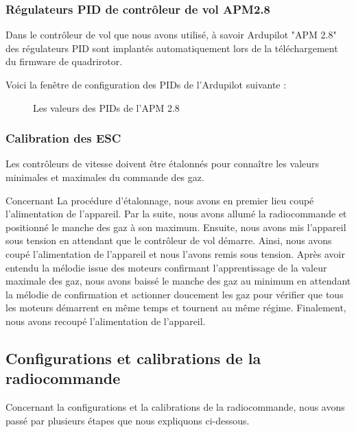 	\subsubsection{Régulateurs PID de contrôleur de vol APM2.8}
	Dans le contrôleur de vol que nous avons utilisé, à savoir Ardupilot "APM 2.8" des régulateurs PID sont implantés automatiquement lors de la téléchargement du firmware de quadrirotor.
	
	Voici la fenêtre de configuration des PIDs de l'Ardupilot suivante :
	\begin{figure} [H]
		\begin{center}
			\centering
		\end{center}
		\caption{Les valeurs des PIDs de l'APM 2.8}
	\end{figure}
	
	\subsubsection{Calibration des ESC}
	Les contrôleurs de vitesse doivent être étalonnés pour connaître les valeurs minimales et maximales du commande des gaz. 
	
	Concernant La procédure d’étalonnage, nous avons en premier lieu coupé l'alimentation de l'appareil. Par la suite, nous avons allumé la radiocommande et positionné le manche des gaz à son maximum. Ensuite, nous avons mis l'appareil sous tension en attendant que le contrôleur de vol démarre. Ainsi, nous avons coupé l'alimentation de l'appareil et nous l'avons remis sous tension. Après avoir entendu la mélodie issue des moteurs confirmant l'apprentissage de la valeur maximale des gaz, nous avons baissé le manche des gaz au minimum en attendant la mélodie de confirmation et actionner doucement les gaz pour vérifier que tous les moteurs démarrent en même temps et tournent au même régime. Finalement, nous avons recoupé l'alimentation de l'appareil.
	\subsection{Configurations et calibrations de la radiocommande}
	Concernant la configurations et la calibrations de la radiocommande, nous avons passé par plusieurs étapes que nous expliquons ci-dessous. 

